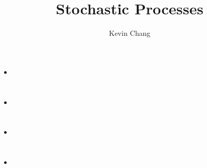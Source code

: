\documentclass[a4paper]{article}
\title{Stochastic Processes}
\author{Kevin Chang}
\begin{document}
\maketitle

\section{}
\begin{itemize}
    \begin{figure} [H]
        \texttt{[image: image/1.png]}
    \end{figure}
    \item 
\end{itemize}

\section{}
\begin{itemize}
    \begin{figure} [H]
        \texttt{[image: image/2.png]}
    \end{figure}
    \item 
\end{itemize}

\section{}
\begin{itemize}
    \begin{figure} [H]
        \texttt{[image: image/3.png]}
    \end{figure}
    \item 
\end{itemize}

\section{}
\begin{itemize}
    \begin{figure} [H]
        \texttt{[image: image/4.png]}
    \end{figure}
    \item 
\end{itemize}
\end{document}
